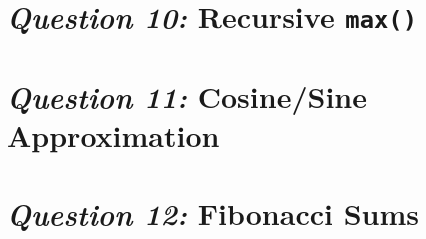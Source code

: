 \documentclass[12pt]{article}
\begin{document}






\section{\textit{Question 10:} Recursive \texttt{max()}}







\section{\textit{Question 11:} Cosine/Sine Approximation}







\section{\textit{Question 12:} Fibonacci Sums}






\end{document}
